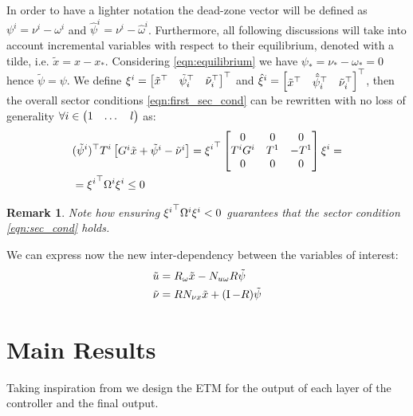 \documentclass{ifacconf}
\theoremstyle{plain}
\newtheorem{remark}{Remark}
\begin{document}
In order to have a lighter notation the dead-zone vector  will be defined as $\psi^i = \nu^i - \omega^i$ and $\hat{\psi}^i = \nu^i - \hat{\omega}^i$. Furthermore, all following discussions will take into account incremental variables with respect to their equilibrium, denoted with a tilde, i.e. $\tilde{x} = x - x_*$. Considering \eqref{eqn:equilibrium} we have $\psi_* = \nu_* - \omega_* = 0$ hence $\tilde{\psi} = \psi$. We define $\xi^i = \left[\begin{matrix}\tilde{x}^\top & \tilde{\psi}_i^\top & \tilde{\nu}_i^\top\end{matrix}\right]^\top$ and $\hat{\xi}^i = \left[\begin{matrix}\tilde{x}^\top & \hat{\tilde{\psi}}_i^\top & \tilde{\nu}_i^\top\end{matrix}\right]^\top$, then the overall sector conditions \eqref{eqn:first_sec_cond} can be rewritten with no loss of generality $\forall i \in \left(\begin{matrix}1 & \dots & l\end{matrix}\right)$ as:
\begin{equation}\label{eqn:sec_cond}
\begin{aligned}
    &({\tilde{\psi}^i})^\top T^i \left[\begin{matrix}G^i \tilde{x} + \tilde{\psi}^i - \tilde{\nu}^i\end{matrix}\right] = {\xi^i}^\top \left[\begin{matrix}0 & 0 & 0\\
    T^i G^i & T^1 & -T^1\\
    0 & 0 & 0\end{matrix}\right] \xi^i = \\
    &= {\xi^i}^\top \Omega^i \xi^i \leq 0
\end{aligned}
\end{equation}

\begin{remark}\label{rem:sec-cond}
Note how ensuring ${\xi^i}^\top \Omega^i \xi^i < 0$ guarantees that the sector condition \eqref{eqn:sec_cond} holds.
\end{remark}

We can express now the new inter-dependency between the variables of interest:
\begin{equation}\label{eqn:incremental}
  \begin{aligned}
    \tilde{u} &= R_{\omega} \tilde{x} - N_{u \omega} R \tilde{\psi}\\
    \tilde{\nu} &= R N_{\nu x} \tilde{x} + (\operatorname{I} - R) \tilde{\psi}
  \end{aligned}
\end{equation}

\section{Main Results}

Taking inspiration from \citep[Proposition 1, Lemma 3]{css-extended} we design the ETM for the output of each layer of the controller and the final output.
\end{document}
